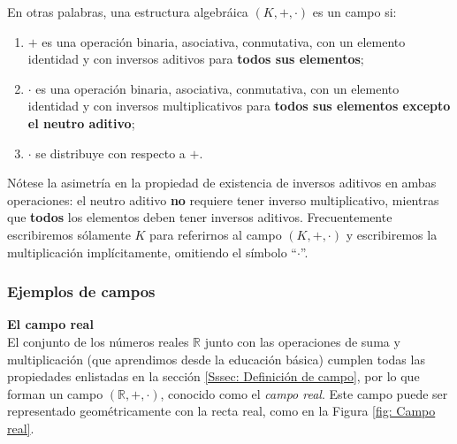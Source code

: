\documentclass[apuntes]{subfiles}
\begin{document}
\begin{obs}\label{obs:1.3}

 En otras palabras, una estructura algebráica $(K,+,\cdot)$ es un campo si:
 \begin{enumerate}[label=(\alph*)]
    \item $+$ es una operación binaria, asociativa, conmutativa, con un elemento identidad y con inversos aditivos para \textbf{todos sus elementos};

    \item $\cdot$ es una operación binaria, asociativa, conmutativa, con un elemento identidad y con inversos multiplicativos para \textbf{todos sus elementos excepto el neutro aditivo};

    \item $\cdot$ se distribuye con respecto a $+$.
\end{enumerate}

\noindent Nótese la asimetría en la propiedad de existencia de inversos aditivos en ambas operaciones: el neutro aditivo \textbf{no} requiere tener inverso multiplicativo, mientras que \textbf{todos} los elementos deben tener inversos aditivos. Frecuentemente escribiremos sólamente $K$ para referirnos al campo $(K,+,\cdot)$ y escribiremos la multiplicación implícitamente, omitiendo el símbolo ``$\cdot$''.
\end{obs}


\subsubsection*{Ejemplos de campos} \label{Sssec: Ejemplos de campos}

\textbf{El campo real} \\

El conjunto de los números reales $\mathbb{R}$ junto con las operaciones de suma y multiplicación (que aprendimos desde la educación básica) cumplen todas las propiedades enlistadas en la sección \ref{Sssec: Definición de campo}, por lo que forman un campo $(\mathbb{R},+,\cdot)$, conocido como el \emph{campo real}. Este campo puede ser representado geométricamente con la recta real, como en la Figura \ref{fig: Campo real}. \\
\end{document}
